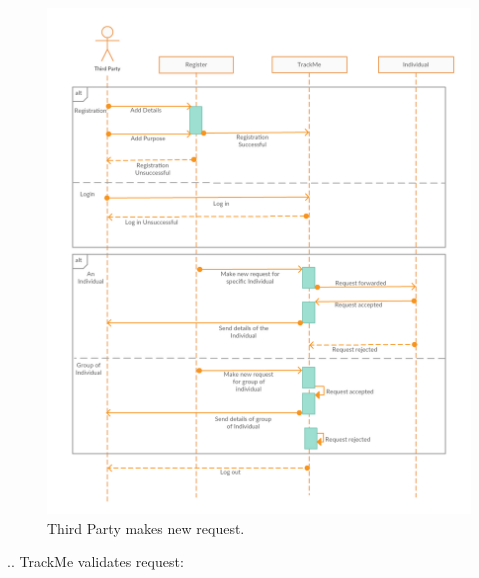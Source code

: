\begin{figure}[H]
	\begin{center}
		\includegraphics[width=\textwidth]{./Sequence/2__ThirdParty.png}
      	\caption{Third Party makes new request.}
        \label{TrackMe_seq2}
	\end{center}
\end{figure}
.\newline{}. TrackMe validates request:
